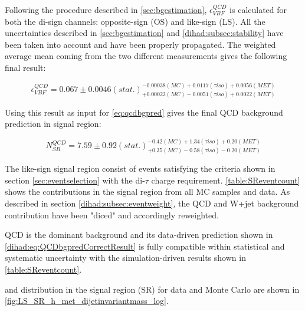 Following the procedure described in \autoref{sec:bgestimation}, $\epsilon^{QCD}_{VBF}$ is calculated for both the di-\hadtau sign channels: opposite-sign (OS) and like-sign (LS). All the uncertainties described in \autoref{sec:bgestimation} and \autoref{dihad:subsec:stability} have been taken into account and have been properly propagated. The weighted average mean coming from the two different measurements gives the following final result:

\begin{equation}
\epsilon^{QCD}_{VBF} = 0.067\pm0.0046(stat.)^{-0.00038(MC)+0.0117(\tau iso)+0.0056(MET)}_{+0.00022(MC)-0.0051(\tau iso)+0.0022(MET)}
\label{eq:vbfefflsresult}
\end{equation}

Using this result as input for \autoref{eq:qcdbgpred} gives the final QCD background prediction in signal region:

\begin{equation}
N^{QCD}_{SR} = 7.59\pm0.92(stat.)^{-0.42(MC)+1.34(\tau iso)+0.20(MET)}_{+0.35(MC)-0.58(\tau iso)-0.20(MET)}
\label{dihad:eq:QCDbgpredCorrectResult}
\end{equation}

The like-sign signal region consist of events satisfying the criteria shown in section \ref{sec:eventselection} with the di-$\tau$ charge requirement. \autoref{table:SReventcount} shows the contributions in the signal region from all MC samples and data. As described in section \ref{dihad:subsec:eventweight}, the QCD and W+jet  background contribution have been "diced" and accordingly reweighted. 

QCD is the dominant background and its data-driven prediction shown in \autoref{dihad:eq:QCDbgpredCorrectResult} is fully compatible within statistical and systematic uncertainty with the simulation-driven results shown in \autoref{table:SReventcount}. 

\met and \mjj distribution in the signal region (SR) for data and Monte Carlo are shown in \autoref{fig:LS_SR_h_met_dijetinvariantmass_log}.

